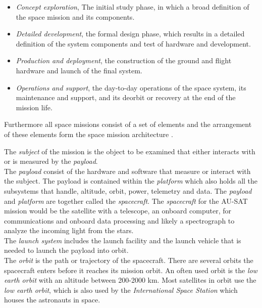 \begin{itemize}
\item \emph{Concept exploration}, The initial study phase, in which a broad definition of the space mission and its components.

\item \emph{Detailed development}, the formal design phase, which results in a detailed definition of the system components and test of hardware and development.

\item \emph{Production and deployment}, the construction of the ground and flight hardware and launch of the final system. 

\item \emph{Operations and support}, the day-to-day operations of the space system, its maintenance and support, and its deorbit or recovery at the end of the mission life. 
\end{itemize}

Furthermore all space missions consist of a set of elements and the arrangement of these elements form the space mission architecture \citep{smad}.

The \textit{subject} of the mission is the object to be examined that either interacts with or is measured by the \textit{payload}.
\\

The \textit{payload} consist of the hardware and software that measure or interact with the subject. The payload is contained within the \textit{platform} which also holds all the subsystems that handle, altitude, orbit, power, telemetry and data. The \textit{payload} and \textit{platform} are together called the \textit{spacecraft}. The \textit{spacecraft} for the AU-SAT mission would be the satellite with a telescope, an onboard computer, for communications and onboard data processing and likely a spectrograph to analyze the incoming light from the stars. 
\\

The \textit{launch system} includes the launch facility and the launch vehicle that is needed to launch the payload into orbit. 
\\

The \textit{orbit} is the path or trajectory of the spacecraft. There are several orbits the spacecraft enters before it reaches its mission orbit. An often used orbit is the \textit{low earth orbit} with an altitude between 200-2000 \si{\kilo\meter}. Most satellites in orbit use the \textit{low earth orbit}, which is also used by the \textit{International Space Station} which houses the astronauts in space. 
\\

